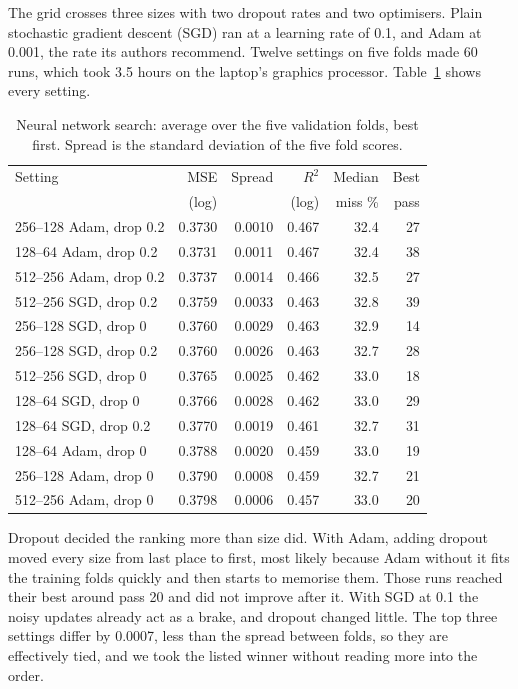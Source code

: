 \documentclass[sigconf,nonacm,10pt]{acmart}
\begin{document}
The grid crosses three sizes with two dropout rates and two optimisers. Plain stochastic gradient descent (SGD) ran at a learning rate of 0.1, and Adam \cite{kingma2015} at 0.001, the rate its authors recommend. Twelve settings on five folds made 60 runs, which took 3.5 hours on the laptop's graphics processor. Table~\ref{tab:nn} shows every setting.

\begin{table}[t]
\caption{Neural network search: average over the five validation folds, best first. Spread is the standard deviation of the five fold scores.}
\label{tab:nn}
\small
\setlength{\tabcolsep}{3pt}
\begin{tabular}{@{}lrrrrr@{}}
\toprule
Setting & MSE & Spread & $R^2$ & Median & Best \\
 & (log) & & (log) & miss \% & pass \\
\midrule
256--128 Adam, drop 0.2 & 0.3730 & 0.0010 & 0.467 & 32.4 & 27 \\
128--64 Adam, drop 0.2 & 0.3731 & 0.0011 & 0.467 & 32.4 & 38 \\
512--256 Adam, drop 0.2 & 0.3737 & 0.0014 & 0.466 & 32.5 & 27 \\
512--256 SGD, drop 0.2 & 0.3759 & 0.0033 & 0.463 & 32.8 & 39 \\
256--128 SGD, drop 0 & 0.3760 & 0.0029 & 0.463 & 32.9 & 14 \\
256--128 SGD, drop 0.2 & 0.3760 & 0.0026 & 0.463 & 32.7 & 28 \\
512--256 SGD, drop 0 & 0.3765 & 0.0025 & 0.462 & 33.0 & 18 \\
128--64 SGD, drop 0 & 0.3766 & 0.0028 & 0.462 & 33.0 & 29 \\
128--64 SGD, drop 0.2 & 0.3770 & 0.0019 & 0.461 & 32.7 & 31 \\
128--64 Adam, drop 0 & 0.3788 & 0.0020 & 0.459 & 33.0 & 19 \\
256--128 Adam, drop 0 & 0.3790 & 0.0008 & 0.459 & 32.7 & 21 \\
512--256 Adam, drop 0 & 0.3798 & 0.0006 & 0.457 & 33.0 & 20 \\
\bottomrule
\end{tabular}
\end{table}

Dropout decided the ranking more than size did. With Adam, adding dropout moved every size from last place to first, most likely because Adam without it fits the training folds quickly and then starts to memorise them. Those runs reached their best around pass 20 and did not improve after it. With SGD at 0.1 the noisy updates already act as a brake, and dropout changed little. The top three settings differ by 0.0007, less than the spread between folds, so they are effectively tied, and we took the listed winner without reading more into the order.
\end{document}
